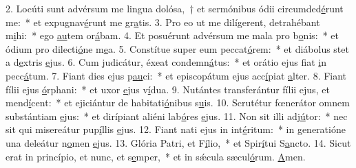 2. Locúti sunt advérsum me lingua dolósa,~† et sermónibus ódii circumded\uline{é}runt me:~* et expugnav\uline{é}runt me gr\uline{a}tis.
3. Pro eo ut me dilígerent, detrahébant m\uline{i}hi:~* ego \uline{au}tem or\uline{á}bam.
4. Et posuérunt advérsum me mala pro b\uline{o}nis:~* et ódium pro dilecti\uline{ó}ne m\uline{e}a.
5. Constítue super eum peccat\uline{ó}rem:~* et diábolus stet a d\uline{e}xtris \uline{e}jus.
6. Cum judicátur, éxeat condemn\uline{á}tus:~* et orátio ejus fiat \uline{i}n pecc\uline{á}tum.
7. Fiant dies ejus p\uline{au}ci:~* et episcopátum ejus acc\uline{í}piat \uline{a}lter.
8. Fiant fílii ejus \uline{ó}rphani:~* et uxor \uline{e}jus v\uline{í}dua.
9. Nutántes transferántur fílii ejus, et mend\uline{í}cent:~* et ejiciántur de habitati\uline{ó}nibus s\uline{u}is.
10. Scrutétur fœnerátor omnem substántiam \uline{e}jus:~* et dirípiant aliéni lab\uline{ó}res \uline{e}jus.
11. Non sit illi adj\uline{ú}tor:~* nec sit qui misereátur pup\uline{í}llis \uline{e}jus.
12. Fiant nati ejus in int\uline{é}ritum:~* in generatióne una deleátur n\uline{o}men \uline{e}jus.
13. Glória Patri, et F\uline{í}lio,~* et Spir\uline{í}tui S\uline{a}ncto.
14. Sicut erat in princípio, et nunc, et s\uline{e}mper,~* et in sǽcula sæcul\uline{ó}rum. \uline{A}men.
